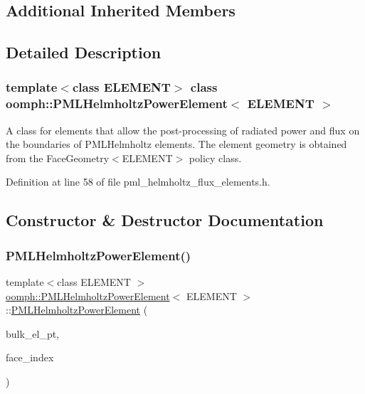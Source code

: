\subsection*{Additional Inherited Members}


\subsection{Detailed Description}
\subsubsection*{template$<$class E\+L\+E\+M\+E\+NT$>$\newline
class oomph\+::\+P\+M\+L\+Helmholtz\+Power\+Element$<$ E\+L\+E\+M\+E\+N\+T $>$}

A class for elements that allow the post-\/processing of radiated power and flux on the boundaries of P\+M\+L\+Helmholtz elements. The element geometry is obtained from the Face\+Geometry$<$\+E\+L\+E\+M\+E\+N\+T$>$ policy class. 

Definition at line 58 of file pml\+\_\+helmholtz\+\_\+flux\+\_\+elements.\+h.



\subsection{Constructor \& Destructor Documentation}
\mbox{\label{classoomph_1_1PMLHelmholtzPowerElement_a5e54346ab4784c53fe22d8b7de1845d2}} 
\subsubsection{\texorpdfstring{P\+M\+L\+Helmholtz\+Power\+Element()}{PMLHelmholtzPowerElement()}\hspace{0.1cm}{\footnotesize\ttfamily [1/3]}}
{\footnotesize\ttfamily template$<$class E\+L\+E\+M\+E\+NT $>$ \\
\hyperlink{classoomph_1_1PMLHelmholtzPowerElement}{oomph\+::\+P\+M\+L\+Helmholtz\+Power\+Element}$<$ E\+L\+E\+M\+E\+NT $>$\+::\hyperlink{classoomph_1_1PMLHelmholtzPowerElement}{P\+M\+L\+Helmholtz\+Power\+Element} (\begin{DoxyParamCaption}\item[{\hyperlink{classoomph_1_1FiniteElement}{Finite\+Element} $\ast$const \&}]{bulk\+\_\+el\+\_\+pt,  }\item[{const int \&}]{face\+\_\+index }\end{DoxyParamCaption})}



